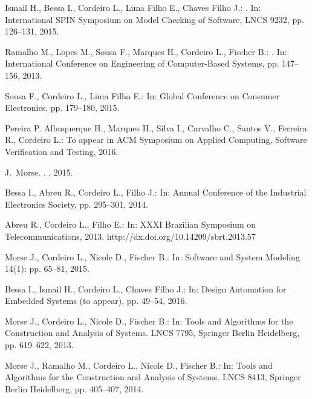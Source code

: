 \documentclass{acm_sen_article}
\begin{document}
\begin{thebibliography}{1}
Ismail H., Bessa I., Cordeiro L., Lima Filho E., Chaves Filho J.:
. 
\newblock In: International SPIN Symposium on Model Checking of Software, LNCS 9232, pp. 126--131, 2015.

Ramalho M., Lopes M., Sousa F., Marques H., Cordeiro L., Fischer B.:
.
\newblock In: International Conference on Engineering of Computer-Based Systems, pp. 147--156, 2013.

Sousa F., Cordeiro L., Lima Filho E.: 
\newblock In: Global Conference on Consumer Electronics, pp. 179--180, 2015.

Pereira P.  Albuquerque H., Marques H., Silva I., Carvalho C., Santos V., Ferreira R., Cordeiro L.: 
\newblock To appear in ACM Symposium on Applied Computing, Software Verification and Testing, 2016. 

J.~Morse.
.
, 2015.

Bessa I., Abreu R., Cordeiro L., Filho J.:
\newblock In: Annual Conference of the Industrial Electronics Society, pp. 295--301, 2014.

Abreu R., Cordeiro L., Filho E.:
\newblock In: XXXI Brazilian Symposium on Telecommunications, 2013.
\newblock http://dx.doi.org/10.14209/sbrt.2013.57

Morse J., Cordeiro L., Nicole D., Fischer B.:
\newblock In: Software and System Modeling 14(1): pp. 65--81, 2015.

Bessa I., Ismail H., Cordeiro L., Chaves Filho J.:
\newblock In: Design Automation for Embedded Systems (to appear), pp. 49--54, 2016.

Morse J., Cordeiro L., Nicole D., Fischer B.:
\newblock In: Tools and Algorithms for the Construction and Analysis of
  Systems. LNCS 7795, Springer Berlin Heidelberg, pp. 619--622, 2013.

Morse J., Ramalho M., Cordeiro L., Nicole D., Fischer B.:
\newblock In: Tools and Algorithms for the Construction and Analysis of
  Systems. LNCS 8413, Springer Berlin Heidelberg, pp. 405--407, 2014.

\end{thebibliography}




\end{document}
